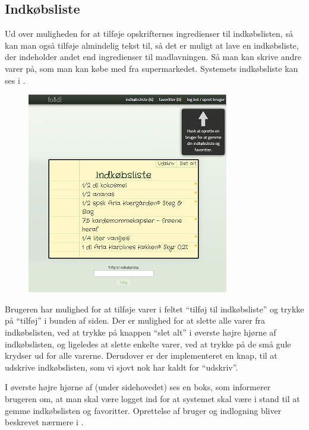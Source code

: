 \subsection{Indkøbsliste}
\label{subsec:brug-indkoebsliste}

Ud over muligheden for at tilføje opskrifternes ingredienser til indkøbslisten, så kan man også tilføje almindelig tekst til, så det er muligt at lave en indkøbsliste, der indeholder andet end ingredienser til madlavningen. Så man kan skrive andre varer på, som man kan købe med fra \fx supermarkedet. Systemets indkøbsliste kan ses i .

\begin{figure}[H]
	\centering
	\includegraphics[scale=1]{billeder/foodl/thumbnails/indkoebsliste.png}
	\label{fig:overblik-indkoebsliste}
\end{figure}

Brugeren har mulighed for at tilføje varer i feltet ``tilføj til indkøbsliste'' og trykke på ``tilføj'' i bunden af siden. Der er mulighed for at slette alle varer fra indkøbslisten, ved at trykke på knappen ``slet alt'' i øverste højre hjørne af indkøbslisten, og ligeledes at slette enkelte varer, ved at trykke på de små gule krydser ud for alle varerne. Derudover er der implementeret en knap, til at udskrive indkøbslisten, som vi sjovt nok har kaldt for ``udskriv''.

I øverste højre hjørne af  (under sidehovedet) ses en boks, som informerer brugeren om, at man skal være logget ind for at systemet skal være i stand til at gemme indkøbslisten og favoritter. Oprettelse af bruger og indlogning bliver beskrevet nærmere i .

